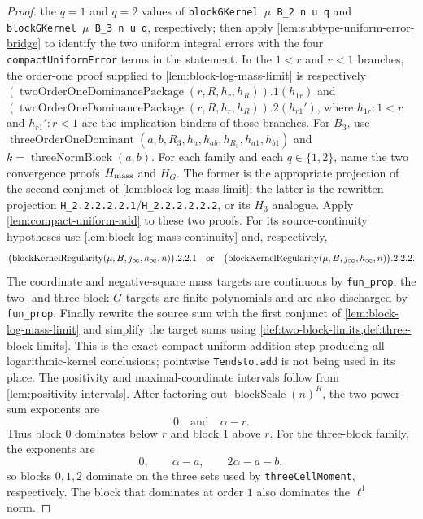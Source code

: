 \documentclass[9pt]{extarticle}
\theoremstyle{definition}
\theoremstyle{remark}
\begin{document}
\begin{proof}
the $q=1$ and $q=2$ values of
\texttt{blockGKernel $\mu$ B\_2 n u q} and
\texttt{blockGKernel $\mu$ B\_3 n u q}, respectively; then apply
\cref{lem:subtype-uniform-error-bridge} to identify the two uniform integral
errors with the four \texttt{compactUniformError} terms in the statement.
In the $1<r$ and $r<1$ branches, the order-one proof supplied to
\cref{lem:block-log-mass-limit} is respectively
$(\operatorname{twoOrderOneDominancePackage}(r,R,h_r,h_R)).1(h_{1r})$
and
$(\operatorname{twoOrderOneDominancePackage}(r,R,h_r,h_R)).2(h_{r1}')$,
where $h_{1r}:1<r$ and $h_{r1}':r<1$ are the implication binders of those
branches.  For $B_3$, use
$\operatorname{threeOrderOneDominant}
(a,b,R_3,h_a,h_{ab},h_{R_3},h_{a1},h_{b1})$ and
$k=\operatorname{threeNormBlock}(a,b)$.
For each family and each $q\in\{1,2\}$, name the two convergence proofs
$H_{\rm mass}$ and $H_G$.  The former is the appropriate projection of
the second conjunct of \cref{lem:block-log-mass-limit}; the latter is the
rewritten projection
\texttt{H\_2.2.2.2.2.1}/\texttt{H\_2.2.2.2.2.2}, or its $H_3$
analogue.  Apply \cref{lem:compact-uniform-add} to these two proofs.
For its source-continuity hypotheses use
\cref{lem:block-log-mass-continuity} and, respectively,
\[
 \bigl(\operatorname{blockKernelRegularity}
  (\mu,B,j_\infty,h_\infty,n)\bigr).2.2.1
 \quad\hbox{or}\quad
 \bigl(\operatorname{blockKernelRegularity}
  (\mu,B,j_\infty,h_\infty,n)\bigr).2.2.2.
\]
The coordinate and negative-square mass targets are continuous by
\texttt{fun\_prop}; the two- and three-block $G$ targets are finite
polynomials and are also discharged by \texttt{fun\_prop}.  Finally rewrite
the source sum with the first conjunct of
\cref{lem:block-log-mass-limit} and simplify the target sums using
\cref{def:two-block-limits,def:three-block-limits}.  This is the exact
compact-uniform addition step producing all logarithmic-kernel conclusions;
pointwise \texttt{Tendsto.add} is not being used in its place.
The positivity and maximal-coordinate intervals follow from
\cref{lem:positivity-intervals}. After factoring out
$\operatorname{blockScale}(n)^R$, the two
power-sum exponents are
\[
 0\quad\text{and}\quad\alpha-r.
\]
Thus block $0$ dominates below $r$ and block $1$ above $r$. For the
three-block family, the exponents are
\[
 0,\qquad\alpha-a,\qquad2\alpha-a-b,
\]
so blocks $0,1,2$ dominate on the three sets used by
\texttt{threeCellMoment}, respectively. The block that
dominates at order $1$ also dominates the $\ell^1$ norm.


\end{proof}
\end{document}
